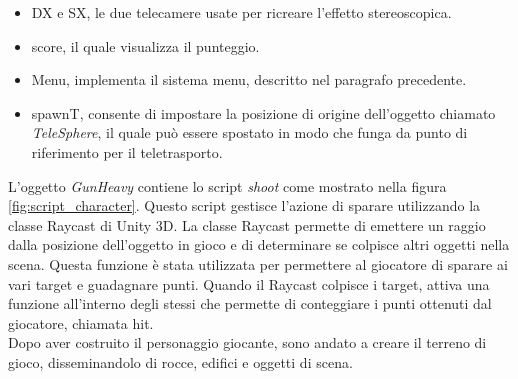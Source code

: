 \documentclass[
a4paper,
cleardoublepage=empty,
headings=twolinechapter,
numbers=autoenddot,
]{scrbook}
\begin{document}
    \begin{itemize}
        \item DX e SX, le due telecamere usate per ricreare l'effetto stereoscopica.
        \item score, il quale visualizza il punteggio.
        \item Menu, implementa il sistema menu, descritto nel paragrafo precedente.
        \item spawnT, consente di impostare la posizione di origine dell'oggetto chiamato \textit{TeleSphere}, il quale può essere spostato in modo che funga da punto di riferimento per il teletrasporto.
    \end{itemize}
    L'oggetto \textit{GunHeavy} contiene lo script \textit{shoot} come mostrato nella figura \ref{fig:script_character}. Questo script gestisce l'azione di sparare utilizzando la classe Raycast di Unity 3D. La classe Raycast permette di emettere un raggio dalla posizione dell'oggetto in gioco e di determinare se colpisce altri oggetti nella scena. Questa funzione è stata utilizzata per permettere al giocatore di sparare ai vari target e guadagnare punti.
    Quando il Raycast colpisce i target, attiva una funzione all'interno degli stessi che permette di conteggiare i punti ottenuti dal giocatore, chiamata hit.\\
    Dopo aver costruito il personaggio giocante, sono andato a creare il terreno di gioco, disseminandolo di rocce, edifici e oggetti di scena.
\end{document}
